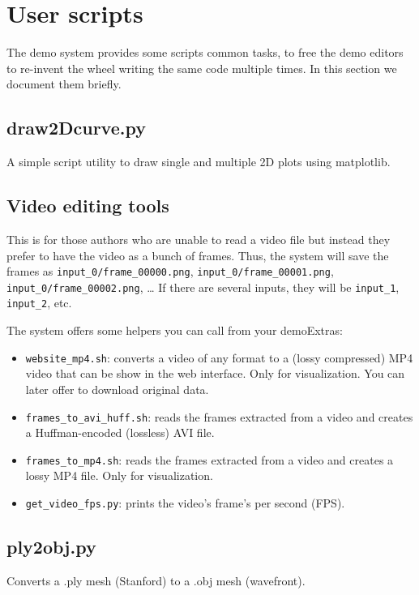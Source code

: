 \section{User scripts}
The demo system provides some scripts common tasks, to free the demo editors to re-invent the wheel writing the same code multiple times.
In this section we document them briefly.

\subsection{draw2Dcurve.py}
A simple script utility to draw single and multiple 2D plots using matplotlib.


\subsection{Video editing tools}
This is for those authors who are unable to read a video file but instead they prefer to have the video as a bunch of frames.
Thus, the system will save the frames as {\tt input\_0/frame\_00000.png}, {\tt input\_0/frame\_00001.png}, {\tt input\_0/frame\_00002.png}, \dots
If there are several inputs, they will be {\tt input\_1}, {\tt input\_2}, etc.

The system offers some helpers you can call from your demoExtras:
\begin{itemize}
    \item {\tt website\_mp4.sh}: converts a video of any format to a (lossy compressed) MP4 video that can be show in the web interface. Only for visualization. You can later offer to download original data.
    \item {\tt frames\_to\_avi\_huff.sh}: reads the frames extracted from a video and creates a Huffman-encoded (lossless) AVI file.
    \item {\tt frames\_to\_mp4.sh}: reads the frames extracted from a video and creates a lossy MP4 file. Only for visualization.
    \item {\tt get\_video\_fps.py}: prints the video's frame's per second (FPS).
\end{itemize}

\subsection{ply2obj.py}
Converts a .ply mesh (Stanford) to a .obj mesh (wavefront).
